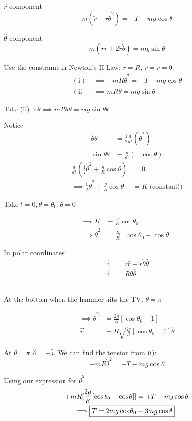 \documentclass[10pt]{scrartcl}
\begin{document}
\begin{example}[\href{https://www.youtube.com/watch?v=qybUFnY7Y8w}{OK Go Video}]
$\hat{r}$ component: 
\[
  m(\ddot{r} - r\dot{\theta}^2) = -T-mg\cos\theta \tag{i}
\]

$\hat{\theta}$ component:
\[
  m(r\ddot{r} + 2\dot{r}\dot{\theta}) = mg\sin\theta \tag{ii}
\]

Use the constraint in Newton's II Law: $r = R$, $\dot{r} = \ddot{r} = 0$. 
\[
\begin{aligned}
  \mathrm{(i)} &\implies -mR\dot{\theta}^2 = -T-mg\cos\theta \\
  \mathrm{(ii)} &\implies mR\ddot{\theta} = mg\sin\theta
\end{aligned}
\]

Take (ii) $\times \dot{\theta} \implies mR\ddot{\theta}\dot{\theta} = mg\sin\theta\dot{\theta}$. 

Notice 
\[
\begin{aligned}
  \ddot{\theta}\dot{\theta} &= \frac{1}{2}\frac{d}{dt}(\dot{\theta}^2)\\
  \sin\theta\dot{\theta} &= \frac{d}{dt}(-\cos\theta)
\end{aligned}
\]
\[
\begin{aligned}
    \frac{d}{dt}(\frac{1}{2}\dot{\theta}^2 + \frac{g}{R}\cos\theta) &= 0\\
  \implies \frac{1}{2}\dot{\theta}^2 + \frac{g}{R}\cos\theta &= K \text{ (constant!)}
\end{aligned}
\]

Take $t = 0, \theta = \theta_0, \dot{\theta} = 0$

\[
\begin{aligned}
\implies K &= \frac{g}{R}\cos\theta_0\\
\implies \dot{\theta}^2 &= \frac{2g}{R}[\cos\theta_0 - \cos\theta]  
\end{aligned}
\]

In polar coordinates: 
\[
\begin{aligned}
  \vec{v} &= \dot{r}\hat{r} + r\dot{\theta}\hat{\theta}\\
  \vec{v} &= R\dot{\theta}\hat{\theta}
\end{aligned}
\]~

At the bottom when the hammer hits the TV, $\theta = \pi$

\[
\begin{aligned}
  \implies \dot{\theta}^2 &= \frac{2g}{R}[\cos\theta_0 + 1]\\
  \vec{v} &= R\sqrt{\frac{2g}{R}[\cos\theta_0 + 1]}\hat{\theta}
\end{aligned}
\]

At $\theta = \pi, \hat{\theta} = -\hat{j}$. We can find the tension from (i): 
\[-mR\dot{\theta}^2 = -T - mg\cos\theta\]

Using our expression for $\dot{\theta}^2$
\[
\begin{aligned}
  +mR[\frac{2g}{R}[\cos\theta_0 -\cos\theta]] &= +T + mg\cos\theta\\
  \implies \Aboxed{T = 2mg\cos\theta_0 &-3mg\cos\theta} 
\end{aligned}
\]
\end{example}\vsp
\end{document}
